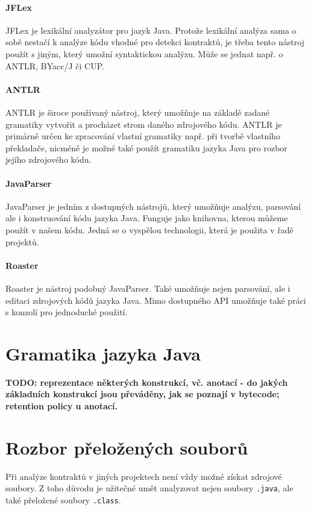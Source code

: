 			\paragraph{JFLex}
				JFLex \cite{jflex} je lexikální analyzátor pro jazyk Java. Protože lexikální analýza sama o sobě nestačí k analýze kódu vhodné pro detekci kontraktů, je třeba tento nástroj použít s jiným, který umožní syntaktickou analýzu. Může se jednat např. o ANTLR, BYacc/J či CUP. 						
						
			\paragraph{ANTLR}			
				ANTLR \cite{antlr} je široce používaný nástroj, který umožňuje na základě zadané gramatiky vytvořit a procházet strom daného zdrojového kódu. ANTLR je primárně určen ke zpracování vlastní gramatiky např. při tvorbě vlastního překladače, nicméně je možné také použít gramatiku jazyka Java pro rozbor jejího zdrojového kódu.
			
			\paragraph{JavaParser}
				JavaParser \cite{javaparser} je jedním z dostupných nástrojů, který umožňuje analýzu, parsování ale i konstruování kódu jazyka Java. Funguje jako knihovna, kterou můžeme použít v našem kódu. Jedná se o vyspělou technologii, která je použita v řadě projektů. 
				
			\paragraph{Roaster}
				Roaster \cite{roaster} je nástroj podobný JavaParser. Také umožňuje nejen parsování, ale i editaci zdrojových kódů jazyka Java. Mimo dostupného API umožňuje také práci s konzolí  pro jednoduché použití.
	
		
	\section{Gramatika jazyka Java}
		\textbf{\textcolor{pblue}{TODO: reprezentace některých konstrukcí, vč. anotací - do jakých základních konstrukcí jsou převáděny, jak se poznají v bytecode; retention policy u anotací.	}}\\
		
	
	\section{Rozbor přeložených souborů}
		Při analýze kontraktů v jiných projektech není vždy možné získat zdrojové soubory. Z toho důvodu je užitečné umět analyzovat nejen soubory \texttt{.java}, ale také přeložené soubory \texttt{.class}.
	

